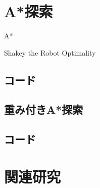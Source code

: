 \documentclass{book}
\begin{document}
\section{A*探索}
A*

Shakey the Robot
Optimality



\subsection{コード}


\subsection{重み付きA*探索}

\subsection{コード}

\section{関連研究}
\end{document}
